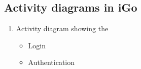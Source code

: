 \documentclass[a4paper,12pt]{article}
\begin{document}
\subsection{Activity diagrams in iGo}
\begin{enumerate}
\item Activity diagram showing the 
\begin{itemize}
    \item Login
    \item Authentication
\end{itemize}
\begin{center}
\end{center}


\end{enumerate}
\end{document}
